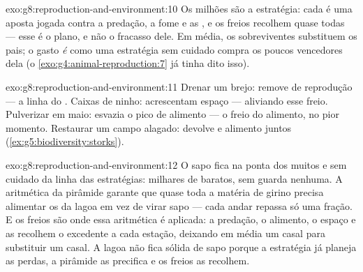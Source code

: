 \begin{solution}{exo:g8:reproduction-and-environment:10}
Os milhões são a estratégia: cada  é uma aposta jogada contra a
predação, a fome e as , e os freios recolhem quase todas ---
esse é o plano, e não o fracasso dele. Em média, os sobreviventes
substituem os pais; o gasto \emph{é} como uma estratégia sem cuidado
compra os poucos vencedores dela (o
\cref{exo:g4:animal-reproduction:7} já tinha dito isso).
\end{solution}

\begin{solution}{exo:g8:reproduction-and-environment:11}
Drenar um brejo: remove  de reprodução --- a linha do .
Caixas de ninho: acrescentam espaço --- aliviando esse freio.
Pulverizar em maio: esvazia o pico de alimento --- o freio do alimento,
no pior momento. Restaurar um campo alagado: devolve  e
alimento juntos (\cref{ex:g5:biodiversity:storks}).
\end{solution}

\begin{solution}{exo:g8:reproduction-and-environment:12}
O sapo fica na ponta dos muitos e sem cuidado da linha das
estratégias: milhares de  baratos, sem guarda nenhuma. A
aritmética da pirâmide garante que quase toda a matéria de girino
precisa alimentar os  da lagoa em vez de virar sapo ---
cada andar repassa só uma fração. E os freios são onde essa aritmética
é aplicada: a predação, o alimento, o espaço e as  recolhem o
excedente a cada estação, deixando em média um casal para substituir
um casal. A lagoa não fica sólida de sapo porque a estratégia já
planeja as perdas, a pirâmide as precifica e os freios as recolhem.
\end{solution}

